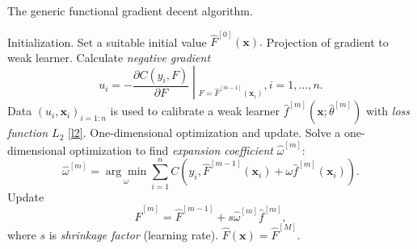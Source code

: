 \documentclass[11pt]{article}
\numberwithin{equation}{section}
\def\bx{\boldsymbol{x}}
\begin{document}
\begin{algorithm}[htp!] %
	\caption{The generic functional gradient decent algorithm.} %
	\label{alg1} %
	\begin{algorithmic}[1] %
		\STATE Initialization. Set a suitable initial value $\hat{F}^{[0]}(\bx).$  
		\STATE Projection of gradient to weak learner.
		Calculate \textit{negative gradient} $$u_i=\left.-\frac{\partial C(y_i,F)}{\partial F}\middle|_{F=\hat{F}^{[m-1]}(\bx_i)}\right., i=1,\ldots,n.$$
		Data $(u_i,\bx_i)_{i=1:n}$ is used to calibrate a weak learner $\hat{f}^{[m]}(\bx;\hat{\theta}^{[m]})$ with \textit{loss function $L_2$} \eqref{l2}.
		\STATE One-dimensional optimization and update.
		Solve a one-dimensional optimization  to find \textit{expansion coefficient} $\hat{\omega}^{[m]}$:
		$$\hat{\omega}^{[m]}=\underset{\omega}{\arg\min}\sum_{i=1}^n C(y_i, \hat{F}^{[m-1]}(\bx_i)+\omega\hat{f}^{[m]}(\bx_i)).$$
		Update $$\hat{F}^{[m]}=\hat{F}^{[m-1]}+s\hat{\omega}^{[m]}\hat{f}^{[m]},$$
		where $s$ is \textit{shrinkage factor} (learning rate).
		\ENDFOR
		\RETURN $\hat{F}(\bx)=\hat{F}^{[M]}$.
	\end{algorithmic}
\end{algorithm}
%	
\end{document}
